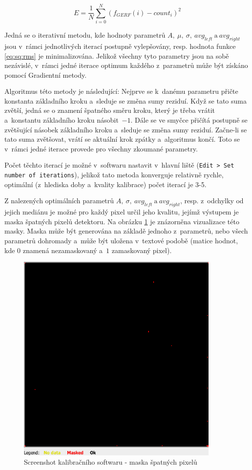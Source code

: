 \begin{equation}\label{eq:sq:rms}
	E = \frac{1}{N} \sum_{i=0}^{N}(f_{GERF}(i) - count_i)^2
\end{equation}

Jedná se o iterativní metodu, kde hodnoty parametrů $A,~\mu,~\sigma,~avg_{left}~\text{a}~avg_{right}$ jsou v~rámci jednotlivých iterací postupně vylepšovány, resp. hodnota funkce \ref{eq:sq:rms} je minimalizována. Jelikož všechny tyto parametry jsou na sobě nezávislé, v~rámci jedné iterace optimum každého z~parametrů může být získáno pomocí Gradientní metody.

Algoritmus této metody je následující: Nejprve se k~danému parametru přičte konstanta základního kroku a~sleduje se změna sumy reziduí. Když se tato suma zvětší, jedná se o znamení špatného směru kroku, který je třeba vrátit a~konstantu základního kroku násobit~$-1$. Dále se ve smyčce přičítá postupně se zvětšující násobek základního kroku a~sleduje se změna sumy reziduí. Začne-li se tato suma zvětšovat, vrátí se aktuální krok zpátky a~algoritmus končí. Toto se v~rámci jedné iterace provede pro všechny zkoumané parametry.

Počet těchto iterací je možné v~softwaru nastavit v~hlavní liště (\texttt{Edit > Set number of iterations}), jelikož tato metoda konverguje relativně rychle, optimální (z~hlediska doby a~kvality kalibrace) počet iterací je 3-5.

Z nalezených optimálních parametrů $A,~\sigma,~avg_{left}~\text{a}~avg_{right}$, resp. z~odchylky od jejich mediánu je možné pro každý pixel určil jeho kvalitu, jejímž výstupem je maska špatných pixelů detektoru. Na obrázku \ref{fig:calib:sw_mask} je znázorněna vizualizace této masky. Maska může být generována na základě jednoho z~parametrů, nebo všech parametrů dohromady a~může být uložena v~textové podobě (matice hodnot, kde $0$ znamená nezamaskovaný a~$1$ zamaskovaný pixel).

\begin{figure}[th!]
	\begin{center}
		\includegraphics[width=10cm]{figures/calibsw_mask.png}
		\caption{Screenshot kalibračního softwaru - maska špatných pixelů}
		\label{fig:calib:sw_mask}
	\end{center}
\end{figure}


